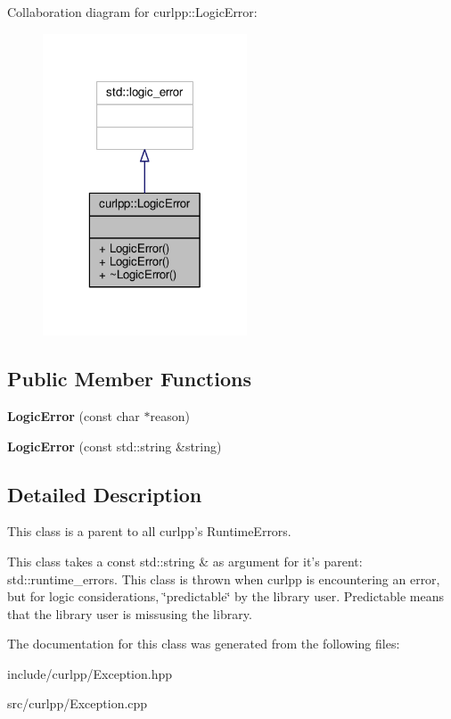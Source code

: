 Collaboration diagram for curlpp\-:\-:Logic\-Error\-:
\nopagebreak
\begin{figure}[H]
\begin{center}
\leavevmode
\includegraphics[width=172pt]{classcurlpp_1_1LogicError__coll__graph}
\end{center}
\end{figure}
\subsection*{Public Member Functions}
\begin{DoxyCompactItemize}
\item 
\hypertarget{classcurlpp_1_1LogicError_a7e669f34fbb8d38de44db338d3cef4fe}{{\bfseries Logic\-Error} (const char $\ast$reason)}\label{classcurlpp_1_1LogicError_a7e669f34fbb8d38de44db338d3cef4fe}

\item 
\hypertarget{classcurlpp_1_1LogicError_aa60cf8ba5dfe9f072af9709a666ae5f8}{{\bfseries Logic\-Error} (const std\-::string \&string)}\label{classcurlpp_1_1LogicError_aa60cf8ba5dfe9f072af9709a666ae5f8}

\end{DoxyCompactItemize}


\subsection{Detailed Description}
This class is a parent to all curlpp's Runtime\-Errors. 

This class takes a const std\-::string \& as argument for it's parent\-: std\-::runtime\-\_\-errors. This class is thrown when curlpp is encountering an error, but for logic considerations, \char`\"{}predictable\char`\"{} by the library user. Predictable means that the library user is missusing the library. 

The documentation for this class was generated from the following files\-:\begin{DoxyCompactItemize}
\item 
include/curlpp/Exception.\-hpp\item 
src/curlpp/Exception.\-cpp\end{DoxyCompactItemize}

